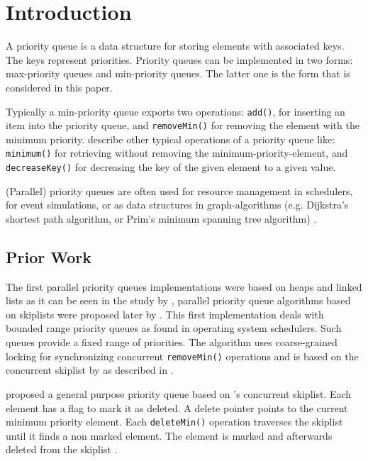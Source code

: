 
\section{Introduction}

A priority queue is a data structure for storing elements with associated keys. The keys represent priorities. Priority queues can be implemented in two forms: max-priority queues and min-priority queues. The latter one is the form that is considered in this paper.

Typically a min-priority queue exports two operations: \texttt{add()}, for inserting an item into the priority queue, and \texttt{removeMin()} for removing the element with the minimum priority. \citeauthor{cormen_introduction_2009} describe other typical operations of a priority queue like: \texttt{minimum()} for retrieving without removing the minimum-priority-element, and \texttt{decreaseKey()} for decreasing the key of the given element to a given value.

(Parallel) priority queues are often used for resource management in schedulers, for event simulations, or as data structures in graph-algorithms (e.g. Dijkstra's shortest path algorithm, or Prim's minimum spanning tree algorithm) \cite{cormen_introduction_2009}.

\subsection{Prior Work}

The first parallel priority queues implementations were based on heaps and linked lists as it can be seen in the study by \citeauthor{ronngren_comparative_1997} \cite{ronngren_comparative_1997}, parallel priority queue algorithms based on skiplists were proposed later by \citeauthor{shavit_scalable_1999}. This first implementation deals with bounded range priority queues as found in operating system schedulers. Such queues provide a fixed range of priorities. The algorithm uses coarse-grained locking for synchronizing concurrent \texttt{removeMin()} operations and is based on the concurrent skiplist by \citeauthor{pugh_concurrent_1990} as described in \cite{pugh_concurrent_1990} \cite{shavit_scalable_1999}.

\citeauthor{lotan_skiplist-based_2000} proposed a general purpose priority queue based on \citeauthor{pugh_concurrent_1990}'s concurrent skiplist. Each element has a flag to mark it as deleted. A delete pointer points to the current minimum priority element. Each \texttt{deleteMin()} operation traverses the skiplist until it finds a non marked element. The element is marked and afterwards deleted from the skiplist \cite{lotan_skiplist-based_2000}.

